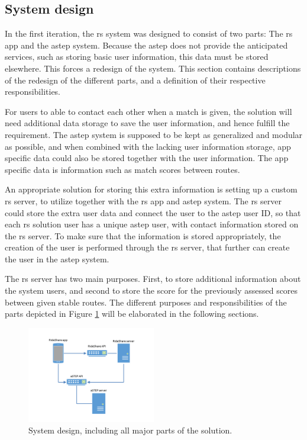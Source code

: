 \subsection{System design}\label{sec:s2systemdesign}
In the first iteration, the \gls{rs} system was designed to consist of two parts: The \gls{rs} app and the \gls{astep} system.
Because the \gls{astep} does not provide the anticipated services, such as storing basic user information, this data must be stored elsewhere.
This forces a redesign of the system.
This section contains descriptions of the redesign of the different parts, and a definition of their respective responsibilities.


For users to able to contact each other when a match is given, the solution will need additional data storage to save the user information, and hence fulfill the requirement.
The \gls{astep} system is supposed to be kept as generalized and modular as possible, and when combined with the lacking user information storage, app specific data could also be stored together with the user information.
The app specific data is information such as match scores between routes.


An appropriate solution for storing this extra information is setting up a custom \gls{rs} server, to utilize together with the \gls{rs} app and \gls{astep} system.
The \gls{rs} server could store the extra user data and connect the user to the \gls{astep} user ID, so that each \gls{rs} solution user has a unique \gls{astep} user, with contact information stored on the \gls{rs} server.
To make sure that the information is stored appropriately, the creation of the user is performed through the \gls{rs} server, that further can create the user in the \gls{astep} system.

The \gls{rs} server has two main purposes.
First, to store additional information about the system users, and second to store the score for the previously assessed scores between given stable routes.
The different purposes and responsibilities of the parts depicted in Figure \ref{fig:s2systemdesign} will be elaborated in the following sections.
\begin{figure}
	\vspace{-12pt}
	\centering
	\includegraphics[width=0.5\textwidth,trim={4cm 2cm 4cm 2cm},clip]{figures/SystemDesign.png}
	\caption{System design, including all major parts of the solution.}
	\vspace{-12pt}
	\label{fig:s2systemdesign}
\end{figure}

